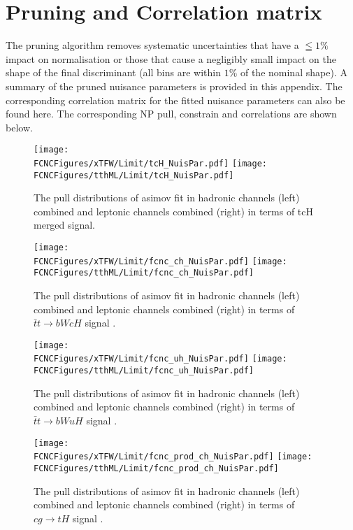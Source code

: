 \section{Pruning and Correlation matrix}
The pruning algorithm removes systematic uncertainties that have a  $\leqq 1\%$ impact on normalisation or those that cause a negligibly small impact on the shape of the final discriminant (all bins are within $1\%$ of the nominal shape). A summary of the pruned nuisance parameters is provided in this appendix.
The corresponding correlation matrix for the fitted nuisance parameters can also be found here. The corresponding NP pull, constrain and correlations are shown below.
\begin{figure}[H]
\centering
\texttt{[image: \\FCNCFigures/xTFW/Limit/tcH\_NuisPar.pdf]}
\texttt{[image: \\FCNCFigures/tthML/Limit/tcH\_NuisPar.pdf]}
\caption{ The pull distributions of asimov fit in hadronic channels (left) combined and leptonic channels combined (right) in terms of tcH merged signal.}
\label{fig:tcH_NuisPar}
\end{figure}

\begin{figure}[H]
\centering
\texttt{[image: \\FCNCFigures/xTFW/Limit/fcnc\_ch\_NuisPar.pdf]}
\texttt{[image: \\FCNCFigures/tthML/Limit/fcnc\_ch\_NuisPar.pdf]}
\caption{ The pull distributions of asimov fit in hadronic channels (left) combined and leptonic channels combined (right) in terms of $\bar{t}t\to bWcH$ signal . }
\label{fig:fcnc_ch_NuisPar}
\end{figure}

\begin{figure}[H]
\centering
\texttt{[image: \\FCNCFigures/xTFW/Limit/fcnc\_uh\_NuisPar.pdf]}
\texttt{[image: \\FCNCFigures/tthML/Limit/fcnc\_uh\_NuisPar.pdf]}
\caption{ The pull distributions of asimov fit in hadronic channels (left) combined and leptonic channels combined (right) in terms of $\bar{t}t\to bWuH$ signal . }
\label{fig:fcnc_uh_NuisPar}
\end{figure}

\begin{figure}[H]
\centering
\texttt{[image: \\FCNCFigures/xTFW/Limit/fcnc\_prod\_ch\_NuisPar.pdf]}
\texttt{[image: \\FCNCFigures/tthML/Limit/fcnc\_prod\_ch\_NuisPar.pdf]}
\caption{ The pull distributions of asimov fit in hadronic channels (left) combined and leptonic channels combined (right) in terms of $cg\to tH$ signal . }
\label{fig:fcnc_prod_ch_NuisPar}
\end{figure}

